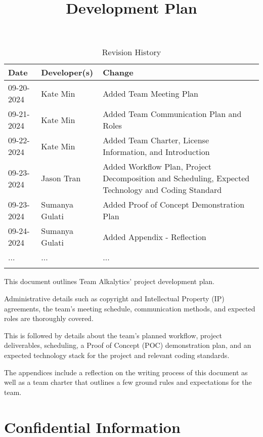 \documentclass{article}
\title{Development Plan\\\progname}
\author{\authname}
\date{}
\begin{document}
\maketitle

\begin{table}[hp]
\caption{Revision History} \label{TblRevisionHistory}
\begin{tabularx}{\textwidth}{llX}
\toprule
\textbf{Date} & \textbf{Developer(s)} & \textbf{Change}\\
\midrule
09-20-2024 & Kate Min & Added Team Meeting Plan\\
09-21-2024 & Kate Min & Added Team Communication Plan and Roles\\
09-22-2024 & Kate Min & Added Team Charter, License Information, and
Introduction\\
09-23-2024 & Jason Tran & Added Workflow Plan, Project Decomposition and Scheduling, Expected Technology and
Coding Standard\\
09-23-2024 & Sumanya Gulati & Added Proof of Concept Demonstration Plan\\
09-24-2024 & Sumanya Gulati & Added Appendix - Reflection\\
... & ... & ...\\
\bottomrule
\label{table:1}
\end{tabularx}
\end{table}

\newpage{}

\noindent This document outlines Team Alkalytics' project development
plan.\newline

\noindent Administrative details such as copyright and Intellectual Property
(IP) agreements, the team's meeting schedule, communication methods, and
expected roles are thoroughly covered.\newline

\noindent This is followed by details about the team's planned workflow, project
deliverables, scheduling, a Proof of Concept (POC) demonstration plan, and an
expected technology stack for the project and relevant coding standards.\newline

\noindent The appendices include a reflection on the writing process of this
document as well as a team charter that outlines a few ground rules and
expectations for the team.

\section{Confidential Information}
\end{document}
